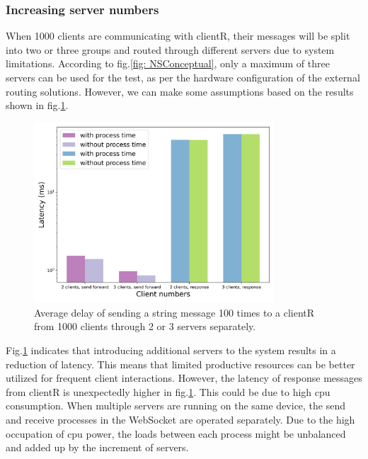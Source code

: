 \subsubsection{Increasing server numbers}
When 1000 clients are communicating with clientR, their messages will be split 
into two or three groups and routed through different servers due to system 
limitations. According to fig.\ref{fig: NSConceptual}, only a maximum of three 
servers can be used for the test, as per the hardware configuration of the external 
routing solutions. However, we can make some assumptions based on the results 
shown in fig.\ref{fig: proportional-servers}.


\begin{figure}[htb]
    \centering
    \includegraphics[width=0.8\textwidth]{figures/tests/proportional_tests/Average_string_messages_receiving_time_of_100_tests_diff_server_numbers.png}\hfill 
    \caption{Average delay of sending a string message 100 times 
    to a clientR from 1000 clients through 2 or 3 servers separately. 
    \label{fig: proportional-servers}}
\end{figure}

Fig.\ref{fig: proportional-servers} indicates that introducing 
additional servers to the system results in a reduction of latency. This means that 
limited productive resources can be better utilized for frequent client interactions. 
However, the latency of response messages from clientR is unexpectedly higher 
in fig.\ref{fig: proportional-servers}. This could be due to high \gls{cpu} consumption. 
When multiple servers are running on the same device, the send and receive processes 
in the WebSocket are operated separately. Due to the high occupation of \gls{cpu} power, 
the loads between each process might be unbalanced and added up by the increment of servers.

